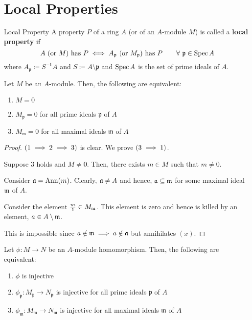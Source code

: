 \pagebreak


\section{Local Properties}

\begin{definition}{Local Property}{}
	A property \(P\) of a ring \(A\) (or of an \(A\)-module \(M\))
	is called a \textbf{local property} if
	\[
		A \text{ (or } M \text{)} \text{ has } P \iff
		A_\mathfrak{p} \text{ (or } M_\mathfrak{p} \text{)} \text{ has } P
		\qquad \forall\ \mathfrak{p} \in \operatorname{Spec} A
	\]
	where \(A_\mathfrak{p} \coloneqq S^{-1}A\) and
	\(S \coloneqq A \setminus \mathfrak{p}\) and
	\(\operatorname{Spec} A\) is the set of prime ideals of \(A\).
\end{definition}

\begin{proposition}{}{}
	Let \(M\) be an \(A\)-module.
	Then, the following are equivalent:
	\begin{enumerate}
		\item \(M = 0\)
		\item \(M_\mathfrak{p} = 0\) for all prime ideals
			\(\mathfrak{p}\) of \(A\)
		\item \(M_\mathfrak{m} = 0\) for all maximal ideals
			\(\mathfrak{m}\) of \(A\)
	\end{enumerate}
\end{proposition}

\begin{proof}
	\(\left( 1 \implies 2 \implies 3 \right)\) is clear.
	We prove \(\left( 3 \implies 1 \right)\).

	Suppose \(3\) holds and \(M \neq 0\).
	Then, there exists \(m \in M\) such that \(m \neq 0\).

	Consider \(\mathfrak{a} = \operatorname{Ann}(m)\).
	Clearly, \(\mathfrak{a} \neq A\) and hence, \(\mathfrak{a} \subseteq \mathfrak{m}\)
	for some maximal ideal \(\mathfrak{m}\) of \(A\).

	Consider the element \(\frac{m}{1} \in M_{\mathfrak{m}}\).
	This element is zero and hence is killed by an element,
	\(a \in A \setminus \mathfrak{m}\).

	This is impossible since \(a \notin \mathfrak{m} \implies a \notin \mathfrak{a}\)
	but annihilates \((x)\).
\end{proof}


\begin{proposition}{}{}
	Let \(\phi \colon M \to N\) be an \(A\)-module homomorphism.
	Then, the following are equivalent:
	\begin{enumerate}
		\item \(\phi\) is injective
		\item \(\phi_\mathfrak{p} \colon M_\mathfrak{p} \to N_\mathfrak{p}\)
			is injective for all prime ideals \(\mathfrak{p}\) of \(A\)
		\item \(\phi_\mathfrak{m} \colon M_\mathfrak{m} \to N_\mathfrak{m}\)
			is injective for all maximal ideals \(\mathfrak{m}\) of \(A\)
	\end{enumerate}
\end{proposition}

